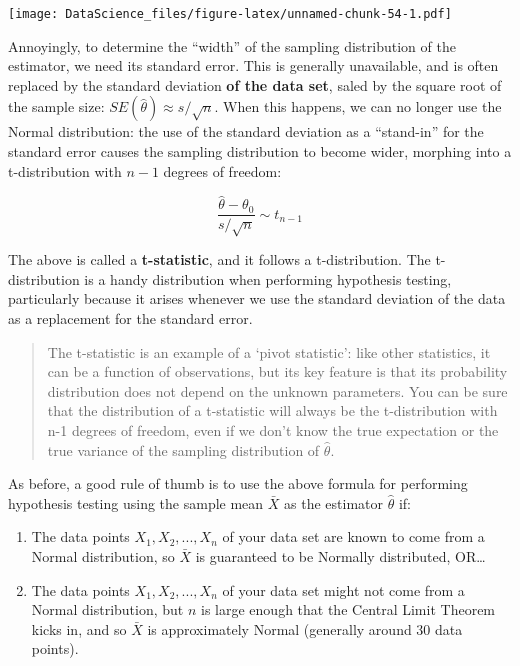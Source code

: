 \documentclass[
]{book}
\begin{document}
\texttt{[image: DataScience\_files/figure-latex/unnamed-chunk-54-1.pdf]}

Annoyingly, to determine the ``width'' of the sampling distribution of the estimator, we need its standard error. This is generally unavailable, and is often replaced by the standard deviation \textbf{of the data set}, saled by the square root of the sample size: \(SE(\hat{\theta}) \approx s/\sqrt{n}\). When this happens, we can no longer use the Normal distribution: the use of the standard deviation as a ``stand-in'' for the standard error causes the sampling distribution to become wider, morphing into a t-distribution with \(n-1\) degrees of freedom:

\[\frac{\hat{\theta} - \theta_0}{s/\sqrt{n}} \sim t_{n-1}\]

The above is called a \textbf{t-statistic}, and it follows a t-distribution. The t-distribution is a handy distribution when performing hypothesis testing, particularly because it arises whenever we use the standard deviation of the data as a replacement for the standard error.

\begin{quote}
The t-statistic is an example of a `pivot statistic': like other statistics, it can be a function of observations, but its key feature is that its probability distribution does not depend on the unknown parameters. You can be sure that the distribution of a t-statistic will always be the t-distribution with n-1 degrees of freedom, even if we don't know the true expectation or the true variance of the sampling distribution of \(\hat{\theta}\).
\end{quote}

As before, a good rule of thumb is to use the above formula for performing hypothesis testing using the sample mean \(\bar{X}\) as the estimator \(\hat{\theta}\) if:

\begin{enumerate}
\def\labelenumi{\arabic{enumi}.}
\item
  The data points \(X_1, X_2, ..., X_n\) of your data set are known to come from a Normal distribution, so \(\bar{X}\) is guaranteed to be Normally distributed, OR\ldots{}
\item
  The data points \(X_1, X_2, ..., X_n\) of your data set might not come from a Normal distribution, but \(n\) is large enough that the Central Limit Theorem kicks in, and so \(\bar{X}\) is approximately Normal (generally around 30 data points).
\end{enumerate}
\end{document}
